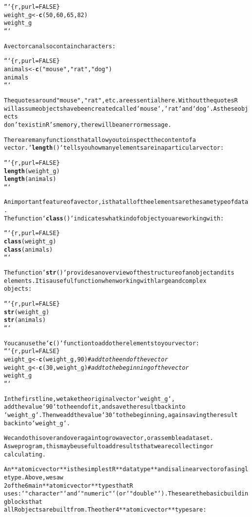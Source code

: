 \documentclass{article}\usepackage[]{graphicx}\usepackage[]{xcolor}
\makeatletter
\newcommand{\hlstr}[1]{\textcolor[rgb]{0.192,0.494,0.8}{#1}}%
\newcommand{\hlcom}[1]{\textcolor[rgb]{0.678,0.584,0.686}{\textit{#1}}}%
\newcommand{\hlkwd}[1]{\textcolor[rgb]{0.737,0.353,0.396}{\textbf{#1}}}%
\newenvironment{kframe}{%
 \def\at@end@of@kframe{}%
 \ifinner\ifhmode%
  \def\at@end@of@kframe{\end{minipage}}%
  \begin{minipage}{\columnwidth}%
 \fi\fi%
 \def\FrameCommand##1{\hskip\@totalleftmargin \hskip-\fboxsep
 \colorbox{shadecolor}{##1}\hskip-\fboxsep
     \hskip-\linewidth \hskip-\@totalleftmargin \hskip\columnwidth}%
 \MakeFramed {\advance\hsize-\width
   \@totalleftmargin\z@ \linewidth\hsize
   \@setminipage}}%
 {\par\unskip\endMakeFramed%
 \at@end@of@kframe}
\newenvironment{knitrout}{}{} %
\makeatother
\begin{document}
\begin{knitrout}
\begin{kframe}
\begin{alltt}
```\{r, purl = FALSE\}
weight_g <- \hlkwd{c}(50, 60, 65, 82)
weight_g
```

A vector can also contain characters:

```\{r, purl = FALSE\}
animals <- \hlkwd{c}(\hlstr{"mouse"}, \hlstr{"rat"}, \hlstr{"dog"})
animals
```

The quotes around \hlstr{"mouse"}, \hlstr{"rat"}, etc. are essential here. Without the quotes R
will assume objects have been created called `mouse`, `rat` and `dog`. As these objects
don\hlstr{'t exist in R'}s memory, there will be an error message.

There are many functions that allow you to inspect the content of a
vector. `\hlkwd{length}()` tells you how many elements are in a particular vector:

```\{r, purl = FALSE\}
\hlkwd{length}(weight_g)
\hlkwd{length}(animals)
```

An important feature of a vector, is that all of the elements are the same type of data.
The function `\hlkwd{class}()` indicates what kind of object you are working with:

```\{r, purl = FALSE\}
\hlkwd{class}(weight_g)
\hlkwd{class}(animals)
```

The function `\hlkwd{str}()` provides an overview of the structure of an object and its
elements. It is a useful function when working with large and complex
objects:

```\{r, purl = FALSE\}
\hlkwd{str}(weight_g)
\hlkwd{str}(animals)
```

You can use the `\hlkwd{c}()` function to add other elements to your vector:
```\{r, purl = FALSE\}
weight_g <- \hlkwd{c}(weight_g, 90) \hlcom{# add to the end of the vector}
weight_g <- \hlkwd{c}(30, weight_g) \hlcom{# add to the beginning of the vector}
weight_g
```

In the first line, we take the original vector `weight_g`,
add the value `90` to the end of it, and save the result back into
`weight_g`. Then we add the value `30` to the beginning, again saving the result
back into `weight_g`.

We can do this over and over again to grow a vector, or assemble a dataset.
As we program, this may be useful to add results that we are collecting or
calculating.

An **atomic vector** is the simplest R **data type** and is a linear vector of a single type. Above, we saw
2 of the 6 main **atomic vector** types  that R
uses: `\hlstr{"character"}` and `\hlstr{"numeric"}` (or `\hlstr{"double"}`). These are the basic building blocks that
all R objects are built from. The other 4 **atomic vector** types are:


\end{alltt}
\end{kframe}
\end{knitrout}
\end{document}
